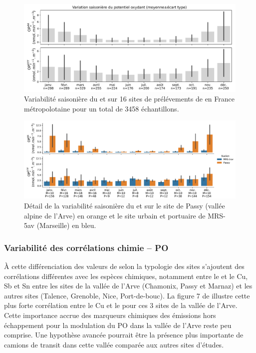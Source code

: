 \begin{figure}[ht]
    \centering
    \includegraphics[width=1.0\linewidth]{figures/chapter04/variabilite_saisonniere.pdf}
    \caption{Variabilité saisonière du \POAAv{} et \PODTTv{} sur 16 sites de prélévements
        de \PMdix{} en France métropolotaine pour un total de 3458 échantillons.
    }%
    \label{fig:variabilite_saisonniere}
\end{figure}


\begin{figure}[ht]
    \centering
    \includegraphics[width=1.0\linewidth]{figures/chapter04/variabilite_saisonniere_MRS-Passy.pdf}
    \caption{Détail de la variabilité saisonière du \POAAv{} et \PODTTv{} sur le site de
        Passy (vallée alpine de l'Arve) en orange et le site urbain et portuaire de MRS-5av
        (Marseille) en bleu.
    }%
    \label{fig:variabilite_saisonniere_MRS_PASSY}
\end{figure}

\subsubsection{Variabilité des corrélations chimie -- PO}%
\label{ssub:_variabilité_des_corrélations_chimie_po}

À cette différenciation des valeurs de \POv{} selon la typologie des sites s'ajoutent des
corrélations différentes avec les espèces chimiques, notamment entre le \POAAv{} et le
Cu, Sb et Sn entre les sites de la vallée de l'Arve (Chamonix, Passy et Marnaz) et les
autres sites (Talence, Grenoble, Nice, Port-de-bouc). La figure 7 de
\cite{calasSeasonal2019} illustre cette plus forte corrélation entre le Cu et le \POAAv{}
pour ces 3 sites de la vallée de l'Arve. Cette importance accrue des marqueurs chimiques des
émissions hors échappement pour la modulation du PO dans la vallée de l'Arve reste peu
comprise. Une hypothèse avancée pourrait être la présence plus importante de camions de
transit dans cette vallée comparée aux autres sites d'études.

